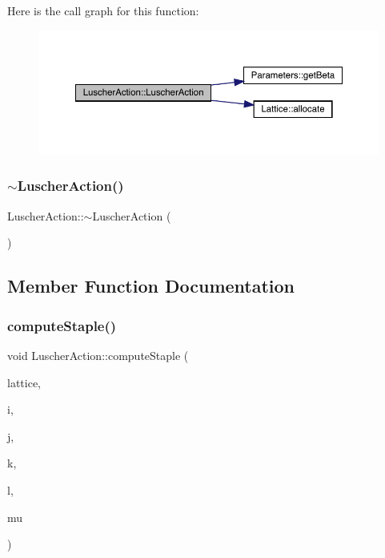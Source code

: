 Here is the call graph for this function\+:
\nopagebreak
\begin{figure}[H]
\begin{center}
\leavevmode
\includegraphics[width=350pt]{class_luscher_action_a2389aab5b35b4c5ccb0ae5a45f68430b_cgraph}
\end{center}
\end{figure}
\mbox{\label{class_luscher_action_a3b4de167f04479da56fd4aa1e7fe0bbb}} 
\subsubsection{\texorpdfstring{$\sim$LuscherAction()}{~LuscherAction()}}
{\footnotesize\ttfamily Luscher\+Action\+::$\sim$\+Luscher\+Action (\begin{DoxyParamCaption}{ }\end{DoxyParamCaption})}



\subsection{Member Function Documentation}
\mbox{\label{class_luscher_action_a42285b6e3015935588e1fab6b90c1a11}} 
\subsubsection{\texorpdfstring{computeStaple()}{computeStaple()}}
{\footnotesize\ttfamily void Luscher\+Action\+::compute\+Staple (\begin{DoxyParamCaption}\item[{\mbox{\hyperlink{class_lattice}{Lattice}}$<$ \mbox{\hyperlink{class_s_u3}{S\+U3}} $>$ $\ast$}]{lattice,  }\item[{unsigned int}]{i,  }\item[{unsigned int}]{j,  }\item[{unsigned int}]{k,  }\item[{unsigned int}]{l,  }\item[{int}]{mu }\end{DoxyParamCaption})\hspace{0.3cm}{\ttfamily [virtual]}}



